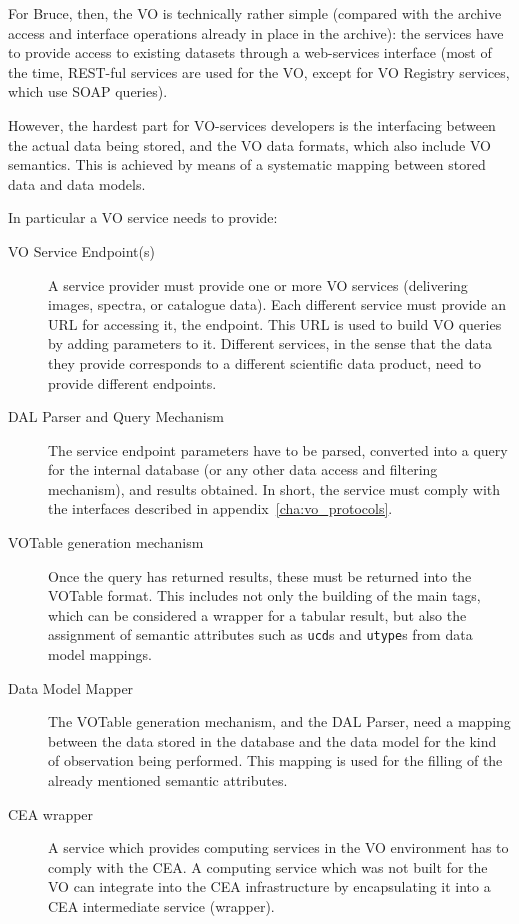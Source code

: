 		For Bruce, then, the VO is technically rather simple
		(compared with the archive access and interface operations
		already in place in the archive): the services have to
		provide access to existing datasets through a web-services
		interface (most of the time, REST-ful services are used for
		the VO, except for VO Registry services, which use SOAP
		queries).
		
		 However, the hardest part for VO-services developers is
		the interfacing between the actual data being stored, and
		the VO data formats, which also include VO semantics. This
		is achieved by means of a systematic mapping between stored
		data and data models.
		
		 In particular a VO service needs to provide:

		\begin{description}
			\item[VO Service Endpoint(s)]
			A service provider must provide one or more VO services
			(delivering images, spectra, or catalogue data). Each
			different service must provide an URL for accessing it,
			the endpoint. This URL is used to build VO queries by
			adding parameters to it. Different services, in the
			sense that the data they provide corresponds to a
			different scientific data product, need to provide
			different endpoints.
			
			 \item[DAL Parser and Query Mechanism] The service
			endpoint parameters have to be parsed, converted into a
			query for the internal database (or any other data
			access and filtering mechanism), and results obtained.
			In short, the service must comply with the interfaces
			described in appendix~\ref{cha:vo_protocols}.
			
			 \item[VOTable generation mechanism] Once the query has
			returned results, these must be returned into the
			VOTable format. This includes not only the building of
			the main tags, which can be considered a wrapper for a
			tabular result, but also the assignment of semantic
			attributes such as \texttt{ucd}s and \texttt{utype}s
			from data model mappings.
			
			 \item[Data Model Mapper] The VOTable generation
			mechanism, and the DAL Parser, need a mapping between
			the data stored in the database and the data model for
			the kind of observation being performed. This mapping
			is used for the filling of the already mentioned
			semantic attributes.
			
			 \item[CEA wrapper] A service which provides computing
			services in the VO environment has to comply with the
			CEA. A computing service which was not built for the VO
			can integrate into the CEA infrastructure by
			encapsulating it into a CEA intermediate service
			(wrapper).
		\end{description}

